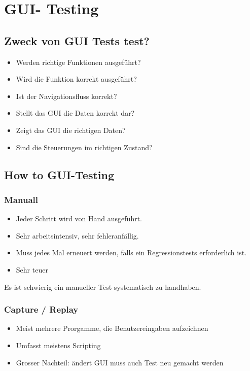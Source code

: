 \documentclass[a4paper,10pt]{article}
\begin{document}




\pagebreak
\section{GUI- Testing}
\subsection{Zweck von GUI Tests test?}
\begin{itemize}
\item Werden richtige Funktionen ausgef\"{u}hrt?
\item Wird die Funktion korrekt ausgef\"{u}hrt?
\item Ist der Navigationsfluss korrekt?
\item Stellt das GUI die Daten korrekt dar?
\item Zeigt das GUI die richtigen Daten?
\item Sind die Steuerungen im richtigen Zustand?
\end{itemize}

\subsection{How to GUI-Testing}
\subsubsection{Manuall}
\begin{itemize}
\item Jeder Schritt wird von Hand ausgef\"{u}hrt.
\item Sehr arbeitsintensiv, sehr fehleranf\"{a}llig.
\item Muss jedes Mal erneuert werden, falls ein Regressionstests erforderlich ist.
\item Sehr teuer
\end{itemize}
Es ist schwierig ein manueller Test systematisch zu handhaben.

\subsubsection{Capture / Replay}
\begin{itemize}
\item Meist mehrere Prorgamme, die Benutzereingaben aufzeichnen
\item Umfasst meistens Scripting
\item Grosser Nachteil: \"{a}ndert GUI muss auch Test neu gemacht werden
\end{itemize}
\end{document}
